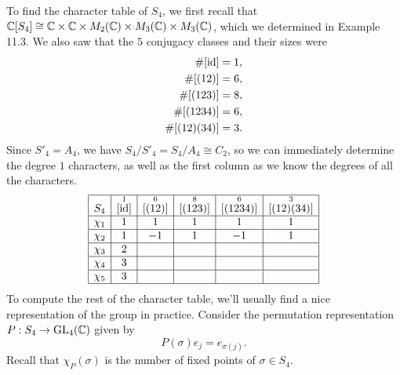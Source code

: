 \begin{exmp}{}
    To find the character table of $S_4$, we first recall that 
    $\mathbb{C}[S_4] \cong \mathbb{C} \times \mathbb{C} \times M_2(\mathbb{C}) \times M_3(\mathbb{C}) \times M_3(\mathbb{C})$, 
    which we determined in Example 11.3. We also saw that the $5$ conjugacy 
    classes and their sizes were 
    \begin{align*} 
        \#[\operatorname{id}] &= 1, \\ 
        \#[(12)] &= 6, \\
        \#[(123)] &= 8, \\
        \#[(1234)] &= 6, \\
        \#[(12)(34)] &= 3. 
    \end{align*}
    Since $S'_4 = A_4$, we have $S_4/S'_4 = S_4/A_4 \cong C_2$, so we can immediately 
    determine the degree $1$ characters, as well as the first column as we 
    know the degrees of all the characters. 
    \begin{align*}
        \begin{array}{|c|c|c|c|c|c|}
            \hline
            S_4    & \overset{1}{[\operatorname{id}]} & \overset{6}{[(12)]} & \overset{8}{[(123)]} & \overset{6}{[(1234)]} & \overset{3}{[(12)(34)]} \\ \hline
            \chi_1 & 1                  & 1                   & 1                    & 1                     & 1                       \\ \hline
            \chi_2 & 1                  & -1                  & 1                    & -1                    & 1                       \\ \hline
            \chi_3 & 2                  &                     &                      &                       &                         \\ \hline
            \chi_4 & 3                  &                     &                      &                       &                         \\ \hline
            \chi_5 & 3                  &                     &                      &                       &                         \\ \hline
        \end{array} 
    \end{align*}
    To compute the rest of the character table, we'll usually find a nice 
    representation of the group in practice. Consider the permutation representation
    $P : S_4 \to \operatorname{GL}_4(\mathbb{C})$ given by 
    \[ P(\sigma)e_j = e_{\sigma(j)}. \] 
    Recall that $\chi_P(\sigma)$ is the number of fixed points of $\sigma \in S_4$. 

\end{exmp}
